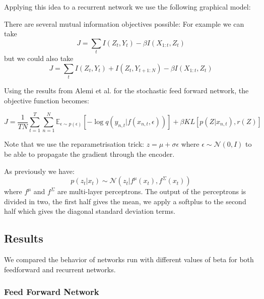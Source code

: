\documentclass[a4paper]{article}
\begin{document}
Applying this idea to a recurrent network we use the following graphical model:

\begin{figure}[H]
\centering
{}
\end{figure}

There are several mutual information objectives possible: 
For example we can take $$ J = \sum_t I(Z_t, Y_t) - \beta I(X_{1:t}, Z_t)$$ but we could also take
$$ J = \sum_t I(Z_t, Y_t) + I(Z_t, Y_{t+1:N}) - \beta I(X_{1:t}, Z_t)$$
 
Using the results from Alemi et al. \cite{vib} for the stochastic feed forward network, the objective function becomes: 
 
 $$ J = \frac{1}{TN} \sum_{t=1}^T \sum_{n=1}^{N} \mathbb{E}_{\epsilon \sim p(\epsilon)}[-\log q(y_{n,t} |f(x_{n,t}, \epsilon))] + \beta KL[p(Z|x_{n, t}), r(Z)]$$
 
 Note that we use the reparametrisation trick: $z = \mu + \sigma \epsilon$ where $\epsilon \sim \mathcal{N}(0, I)$ to be able to propagate the gradient through the encoder. 
 
 As previously we have:
$$ p(z_t|x_t) \sim \mathcal{N}(z_t | f^\mu(x_t), f^\Sigma(x_t))$$ where $f^\mu$ and $f^\Sigma$ are multi-layer perceptrons. The output of the perceptrons is divided in two, the first half gives the mean, we apply a softplus to the second half which gives the diagonal standard deviation terms.

\subsection{Results}

We compared the behavior of networks run with different values of beta for both feedforward and recurrent networks. 

\subsubsection{Feed Forward Network}
\end{document}
